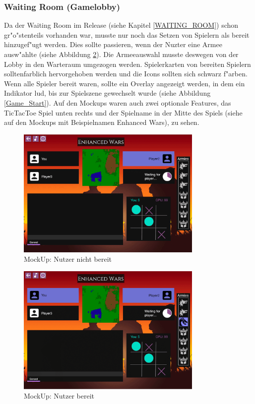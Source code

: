 \documentclass[12pt, titlepage]{scrartcl}
\newcommand{\RN}[1]{%
	\textup{\uppercase\expandafter{\romannumeral#1}}%
}
\begin{document}
		    \subsubsection{Waiting Room (Gamelobby)}
		        Da der Waiting Room im Release \RN{2} (siehe Kapitel \ref{WAITING_ROOM}) schon gr"o"stenteils vorhanden war, musste nur noch das Setzen von Spielern als bereit hinzugef"ugt werden. Dies sollte passieren, wenn der Nuzter eine Armee ausw"ahlte (siehe Abbildung \ref{Ready}). Die Armeeauswahl musste deswegen von der Lobby in den Warteraum umgezogen werden. Spielerkarten von bereiten Spielern solltenfarblich hervorgehoben werden und die Icons sollten sich schwarz f"arben. Wenn alle Spieler bereit waren, sollte ein Overlay angezeigt werden, in dem ein Indikator lud, bis zur Spielszene gewechselt wurde (siehe Abbildung \ref{Game_Start}). Auf den Mockups waren auch zwei optionale Features, das TicTacToe Spiel unten rechts und der Spielname in der Mitte des Spiels (siehe auf den Mockups mit Beispielnamen \glqq Enhanced Wars\grqq), zu sehen. \\
		        \begin{figure}[H] 
    				\centering
    				\includegraphics[width=0.8\textwidth]{images/mockUps/NotReady.png}
    				\caption{MockUp: Nutzer nicht bereit}
    				\label{Not_Ready}
			    \end{figure}
			    \begin{figure}[H] 
    				\centering
    				\includegraphics[width=0.8\textwidth]{images/mockUps/Ready.png}
    				\caption{MockUp: Nutzer bereit}
    				\label{Ready}
			    \end{figure}
\end{document}
